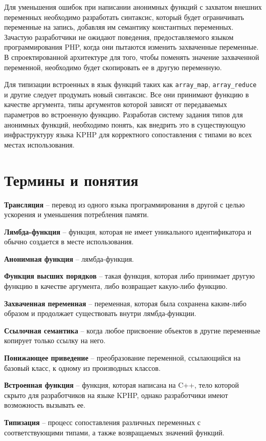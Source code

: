 Для уменьшения ошибок при написании анонимных функций с захватом внешних переменных необходимо разработать синтаксис, который будет ограничивать переменные на запись, добавляя им семантику константных переменных.
Зачастую разработчики не ожидают поведения, предоставляемого языком программирования PHP, когда они пытаются изменить захваченные переменные.
В спроектированной архитектуре для того, чтобы поменять значение захваченной переменной, необходимо будет скопировать ее в другую переменную.

Для типизации встроенных в язык функций таких как \verb|array_map|, \verb|array_reduce| и другие следует продумать новый синтаксис.
Все они принимают функцию в качестве аргумента, типы аргументов которой зависят от передаваемых параметров во встроенную функцию.
Разработав систему задания типов для анонимных функций, необходимо понять, как внедрить это в существующую инфраструктуру языка KPHP для корректного сопоставления с типами во всех местах использования.

\section{Термины и понятия}
\textbf{Трансляция} -- перевод из одного языка программирования в другой с целью ускорения и уменьшения потребления памяти.

\textbf{Лямбда-функция} -- функция, которая не имеет уникального идентификатора и обычно создается в месте использования.

\textbf{Анонимная функция} -- лямбда-функция.

\textbf{Функция высших порядков} -- такая функция, которая либо принимает другую функцию в качестве аргумента, либо возвращает какую-либо функцию.

\textbf{Захваченная переменная} -- переменная, которая была сохранена каким-либо образом и продолжает существовать внутри лямбда-функции.

\textbf{Ссылочная семантика} -- когда любое присвоение объектов в другие переменные копирует только ссылку на него.

\textbf{Понижающее приведение} -- преобразование переменной, ссылающийся на базовый класс, к одному из производных классов.

\textbf{Встроенная функция} -- функция, которая написана на C++, тело которой скрыто для разработчиков на языке KPHP, однако разработчики имеют возможность вызывать ее.

\textbf{Типизация} -- процесс сопоставления различных переменных с соответствующими типами, а также возвращаемых значений функций.


